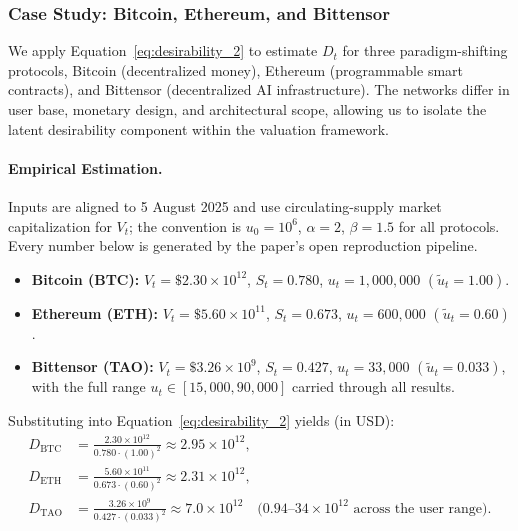 \documentclass[12pt]{article}
\begin{document}
\subsubsection{Case Study: Bitcoin, Ethereum, and Bittensor}

We apply Equation~\eqref{eq:desirability_2} to estimate \( D_t \) for three paradigm-shifting protocols, Bitcoin (decentralized money), Ethereum (programmable smart contracts), and Bittensor (decentralized AI infrastructure). The networks differ in user base, monetary design, and architectural scope, allowing us to isolate the latent desirability component within the valuation framework.

\paragraph{Empirical Estimation.}
Inputs are aligned to 5 August 2025 and use circulating-supply market capitalization for \(V_t\); the convention is \( u_0 = 10^6 \), \( \alpha = 2 \), \( \beta = 1.5 \) for all protocols. Every number below is generated by the paper's open reproduction pipeline.

\begin{itemize}
    \item \textbf{Bitcoin (BTC):} \(V_t = \$2.30\times 10^{12}\), \(S_t = 0.780\), \(u_t = 1{,}000{,}000\) \((\tilde{u}_t = 1.00)\).
    \item \textbf{Ethereum (ETH):} \(V_t = \$5.60\times 10^{11}\), \(S_t = 0.673\), \(u_t = 600{,}000\) \((\tilde{u}_t = 0.60)\).
    \item \textbf{Bittensor (TAO):} \(V_t = \$3.26\times 10^{9}\), \(S_t = 0.427\), \(u_t = 33{,}000\) \((\tilde{u}_t = 0.033)\), with the full range \(u_t \in [15{,}000, 90{,}000]\) carried through all results.
\end{itemize}

\noindent Substituting into Equation~\eqref{eq:desirability_2} yields (in USD):
\[
\begin{aligned}
D_{\text{BTC}} &= \frac{2.30 \times 10^{12}}{0.780 \cdot (1.00)^{2}} \approx 2.95 \times 10^{12}, \\
D_{\text{ETH}} &= \frac{5.60 \times 10^{11}}{0.673 \cdot (0.60)^{2}} \approx 2.31 \times 10^{12}, \\
D_{\text{TAO}} &= \frac{3.26 \times 10^{9}}{0.427 \cdot (0.033)^{2}} \approx 7.0 \times 10^{12} \quad \bigl(0.94\text{--}34 \times 10^{12} \text{ across the user range}\bigr).
\end{aligned}
\]
\end{document}
